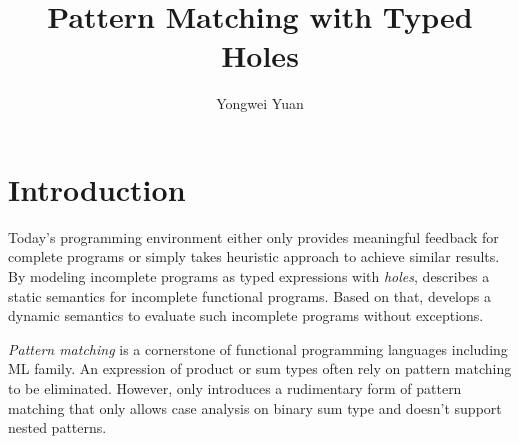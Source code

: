 \documentclass[acmsmall,screen,review,nonacm]{acmart}
\theoremstyle{slplain}
\numberwithin{thm}{section}
\begin{document}
  
\title{Pattern Matching with Typed Holes}

\author{Yongwei Yuan}


\maketitle

\section{Introduction}
\label{sec:intro}
Today's programming environment either only provides meaningful feedback for complete programs or simply takes heuristic approach to achieve similar results.
By modeling incomplete programs as typed expressions with \emph{holes}, \citet{DBLP:conf/popl/OmarVHAH17} describes a static semantics for incomplete functional programs. Based on that, \citet{DBLP:journals/pacmpl/OmarVCH19} develops a dynamic semantics to evaluate such incomplete programs without exceptions.

\emph{Pattern matching} is a cornerstone of functional programming languages including ML family. An expression of product or sum types often rely on pattern matching to be eliminated.
However, \citet{DBLP:journals/pacmpl/OmarVCH19} only introduces a rudimentary form of pattern matching that only allows case analysis on binary sum type and doesn't support nested patterns.
\end{document}
